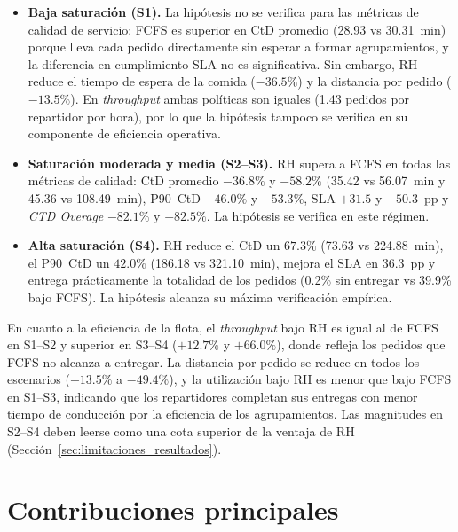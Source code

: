 \documentclass[12pt,letterpaper,oneside]{book}
\begin{document}
	\begin{itemize}
		\item \textbf{Baja saturación (S1).}  La hipótesis no se verifica para
		      las métricas de calidad de servicio: FCFS es superior en CtD promedio
		      (28.93 vs 30.31~min) porque lleva
		      cada pedido directamente sin esperar a formar agrupamientos, y la diferencia
		      en cumplimiento SLA no es significativa.  Sin embargo, RH reduce el tiempo de
		      espera de la comida ($-36.5\%$) y la distancia por pedido ($-13.5\%$).
		      En \textit{throughput} ambas políticas son iguales (1.43 pedidos por repartidor
		      por hora), por lo que la hipótesis tampoco se verifica en su componente de
		      eficiencia operativa.
		\item \textbf{Saturación moderada y media (S2--S3).}  RH supera a FCFS en todas las métricas
		      de calidad: CtD promedio $-36.8\%$ y $-58.2\%$ (35.42 vs 56.07~min y
		      45.36 vs 108.49~min), P90~CtD $-46.0\%$ y $-53.3\%$, SLA $+31.5$ y $+50.3$~pp y
		      \textit{CTD Overage} $-82.1\%$ y $-82.5\%$.
		      La hipótesis se verifica en este régimen.
		\item \textbf{Alta saturación (S4).}  RH reduce el CtD un $67.3\%$
		      (73.63 vs 224.88~min), el P90~CtD un $42.0\%$ (186.18 vs 321.10~min),
		      mejora el SLA en 36.3~pp y entrega prácticamente la totalidad de los pedidos
		      (0.2\% sin entregar vs 39.9\% bajo FCFS).
		      La hipótesis alcanza su máxima verificación empírica.
	\end{itemize}

	En cuanto a la eficiencia de la flota, el \textit{throughput} bajo RH es
	igual al de FCFS en S1--S2 y superior en S3--S4 ($+12.7\%$ y $+66.0\%$), donde refleja
	los pedidos que FCFS no alcanza a entregar.
	La distancia por pedido se reduce en todos los escenarios
	($-13.5\%$ a $-49.4\%$), y la utilización bajo RH es menor que bajo FCFS en
	S1--S3, indicando que los repartidores completan sus entregas con menor tiempo de
	conducción por la eficiencia de los agrupamientos.  Las magnitudes en S2--S4 deben leerse
	como una cota superior de la ventaja de RH (Sección~\ref{sec:limitaciones_resultados}).

	\section{Contribuciones principales}
\end{document}
